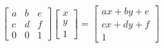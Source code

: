\documentclass{article}
\begin{document}
\thispagestyle{empty}
$$
\begin{bmatrix}a&b&e\\c&d&f\\0&0&1\end{bmatrix}\begin{bmatrix}x\\y\\1\end{bmatrix} = \begin{bmatrix}ax+by+e\\cx+dy+f\\1\end{bmatrix}
$$
\end{document}
